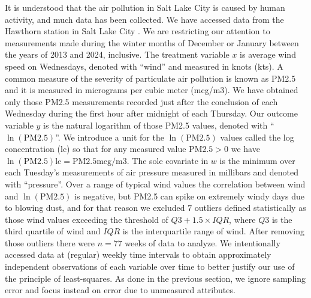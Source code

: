 \documentclass[11pt]{amsart}
\begin{document}
It is understood that the air pollution in Salt Lake City is caused by human activity, and much data has been collected. We have accessed data from the Hawthorn station in Salt Lake City \cite{EPA_AQS}. We are restricting our attention to measurements made during the winter months of December or January between the years of 2013 and 2024, inclusive. The treatment variable $x$ is average wind speed on Wednesdays, denoted with ``wind'' and measured in knots (kts). A common measure of the severity of particulate air pollution is known as PM2.5 and it is measured in micrograms per cubic meter (mcg/m3). We have obtained only those PM2.5 measurements recorded just after the conclusion of each Wednesday during the first hour after midnight of each Thursday. Our outcome variable $y$ is the natural logarithm of those PM2.5 values, denoted with ``$\ln(\textrm{PM2.5})$''. We introduce a unit for the $\ln(\textrm{PM2.5})$ values called the log concentration (lc) so that for any measured value $\textrm{PM2.5}>0$ we have $\ln(\textrm{PM2.5})\textrm{lc}=\textrm{PM2.5mcg/m3}.$ The sole covariate in $w$ is the minimum over each Tuesday's measurements of air pressure measured in millibars and denoted with ``pressure''. Over a range of typical wind values the correlation between wind and $\ln(\textrm{PM2.5})$ is negative, but PM2.5 can spike on extremely windy days due to blowing dust, and for that reason we excluded $7$ outliers defined statistically as those wind values exceeding the threshold of $Q3+1.5\times IQR$, where $Q3$ is the third quartile of wind and $IQR$ is the interquartile range of wind. After removing those outliers there were $n=77$ weeks of data to analyze. We intentionally accessed data at (regular) weekly time intervals to obtain approximately independent observations of each variable over time to better justify our use of the principle of least-squares. As done in the previous section, we ignore sampling error and focus instead on error due to unmeasured attributes.
\end{document}
